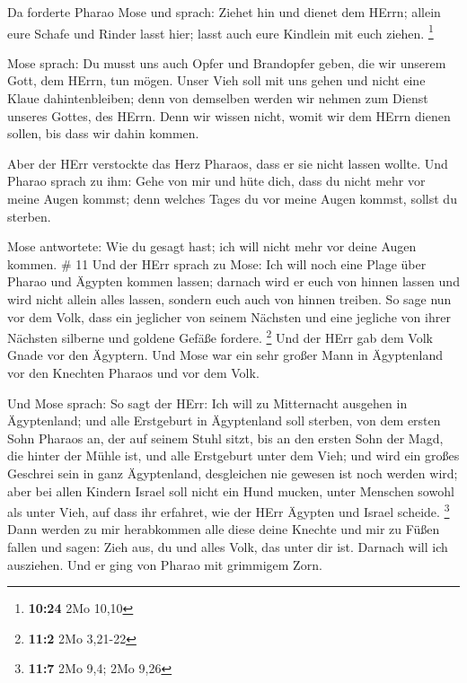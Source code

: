  Da forderte Pharao Mose und sprach: Ziehet hin und dienet
dem HErrn; allein eure Schafe und Rinder lasst hier; lasst auch eure
Kindlein mit euch ziehen. \footnote{\textbf{10:24} 2Mo 10,10}

 Mose sprach: Du musst uns auch Opfer und Brandopfer geben,
die wir unserem Gott, dem HErrn, tun mögen.  Unser Vieh
soll mit uns gehen und nicht eine Klaue dahintenbleiben; denn von
demselben werden wir nehmen zum Dienst unseres Gottes, des HErrn. Denn
wir wissen nicht, womit wir dem HErrn dienen sollen, bis dass wir dahin
kommen.

 Aber der HErr verstockte das Herz Pharaos, dass er sie
nicht lassen wollte.  Und Pharao sprach zu ihm: Gehe von
mir und hüte dich, dass du nicht mehr vor meine Augen kommst; denn
welches Tages du vor meine Augen kommst, sollst du sterben.

 Mose antwortete: Wie du gesagt hast; ich will nicht mehr
vor deine Augen kommen. \# 11  Und der HErr sprach zu Mose:
Ich will noch eine Plage über Pharao und Ägypten kommen lassen; darnach
wird er euch von hinnen lassen und wird nicht allein alles lassen,
sondern euch auch von hinnen treiben.  So sage nun vor dem
Volk, dass ein jeglicher von seinem Nächsten und eine jegliche von ihrer
Nächsten silberne und goldene Gefäße fordere. \footnote{\textbf{11:2}
  2Mo 3,21-22}  Und der HErr gab dem Volk Gnade vor den
Ägyptern. Und Mose war ein sehr großer Mann in Ägyptenland vor den
Knechten Pharaos und vor dem Volk.

 Und Mose sprach: So sagt der HErr: Ich will zu Mitternacht
ausgehen in Ägyptenland;  und alle Erstgeburt in Ägyptenland
soll sterben, von dem ersten Sohn Pharaos an, der auf seinem Stuhl
sitzt, bis an den ersten Sohn der Magd, die hinter der Mühle ist, und
alle Erstgeburt unter dem Vieh;  und wird ein großes
Geschrei sein in ganz Ägyptenland, desgleichen nie gewesen ist noch
werden wird;  aber bei allen Kindern Israel soll nicht ein
Hund mucken, unter Menschen sowohl als unter Vieh, auf dass ihr
erfahret, wie der HErr Ägypten und Israel scheide. \footnote{\textbf{11:7}
  2Mo 9,4; 2Mo 9,26}  Dann werden zu mir herabkommen alle
diese deine Knechte und mir zu Füßen fallen und sagen: Zieh aus, du und
alles Volk, das unter dir ist. Darnach will ich ausziehen. Und er ging
von Pharao mit grimmigem Zorn.

